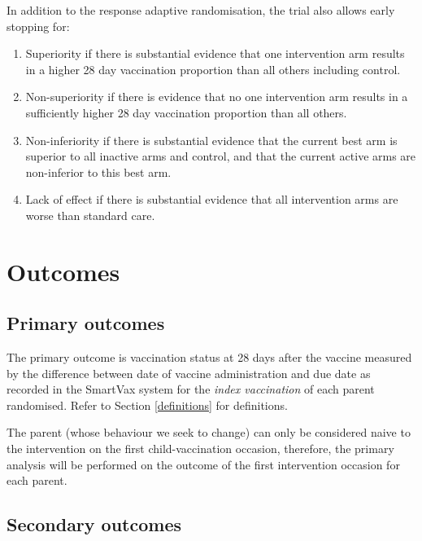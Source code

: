 \documentclass[
  bibliography=totoc]{scrreprt}
\providecommand{\tightlist}{%
  \setlength{\itemsep}{0pt}\setlength{\parskip}{0pt}}
\begin{document}
In addition to the response adaptive randomisation, the trial also allows early stopping for:

\begin{enumerate}
\def\labelenumi{\arabic{enumi})}
\tightlist
\item
  Superiority if there is substantial evidence that one intervention arm results in a higher 28 day vaccination proportion than all others including control.
\item
  Non-superiority if there is evidence that no one intervention arm results in a sufficiently higher 28 day vaccination proportion than all others.
\item
  Non-inferiority if there is substantial evidence that the current best arm is superior to all inactive arms and control, and that the current active arms are non-inferior to this best arm.
\item
  Lack of effect if there is substantial evidence that all intervention arms are worse than standard care.
\end{enumerate}

\hypertarget{outcomes}{%
\section{Outcomes}\label{outcomes}}

\hypertarget{primary-outcomes}{%
\subsection{Primary outcomes}\label{primary-outcomes}}

The primary outcome is vaccination status at 28 days after the vaccine measured by the difference between date of vaccine administration and due date as recorded in the SmartVax system for the \emph{index vaccination} of each parent randomised.
Refer to Section \ref{definitions} for definitions.

The parent (whose behaviour we seek to change) can only be considered naive to the intervention on the first child-vaccination occasion, therefore, the primary analysis will be performed on the outcome of the first intervention occasion for each parent.

\hypertarget{secondary-outcomes}{%
\subsection{Secondary outcomes}\label{secondary-outcomes}}
\end{document}
